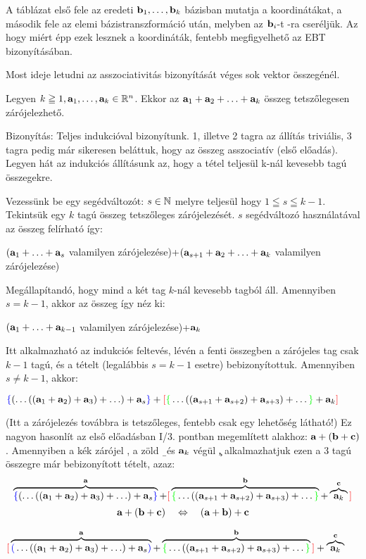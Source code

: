 \documentclass[a4paper,11.5pt]{article}
\begin{document}
	   A táblázat első fele az eredeti $\textbf{b}_1,\ldots,\textbf{b}_k$ bázisban mutatja a koordinátákat, a második fele az elemi bázistranszformáció után, melyben az $\textbf{b}_i$-t \a-ra cseréljük. Az hogy miért épp ezek lesznek a koordináták, fentebb megfigyelhető az EBT bizonyításában.
	
	Most ideje letudni az asszociativitás bizonyítását véges sok vektor összegénél.
	\begin{theorem}
		Legyen $k\geqq 1, \textbf{a}_1, \ldots, \textbf{a}_k \in \mathbb{R}^n$. Ekkor az $\textbf{a}_1+\textbf{a}_2+\ldots+\textbf{a}_k$ összeg tetszőlegesen zárójelezhető.
		
		\noindent Bizonyítás: Teljes indukcióval bizonyítunk. 1, illetve 2 tagra az állítás triviális, 3 tagra pedig már sikeresen beláttuk, hogy az összeg asszociatív (első előadás). Legyen hát az indukciós állításunk az, hogy a tétel teljesül k-nál kevesebb tagú összegekre.
		
		\noindent Vezessünk be egy segédváltozót: $s\in\mathbb{N}$ melyre teljesül hogy $1\leqq s \leqq k-1$. Tekintsük egy $k$ tagú összeg tetszőleges zárójelezését. $s$ segédváltozó használatával az összeg felírható így:
		\begin{center}
			$ (\textbf{a}_1+\ldots+\textbf{a}_s$ valamilyen zárójelezése)+$(\textbf{a}_{s+1}+\textbf{a}_2+\ldots+\textbf{a}_k $ valamilyen zárójelezése)
		\end{center}
		\noindent
		Megállapítandó, hogy mind a két tag $k$-nál kevesebb tagból áll. Amennyiben $s=k-1$, akkor az összeg így néz ki:
		
		\begin{center}
			$ (\textbf{a}_1+\ldots+\textbf{a}_{k-1}$ valamilyen zárójelezése)+$\textbf{a}_k $
		\end{center}
		
		\noindent Itt alkalmazható az indukciós feltevés, lévén a fenti összegben a zárójeles tag csak $k-1$ tagú, és a tételt (legalábbis $s=k-1$ esetre) bebizonyítottuk. Amennyiben $s\not=k-1$, akkor:
		\begin{center}
			$ \textcolor{blue}{\{}
			(\ldots((\textbf{a}_1+\textbf{a}_2)+\textbf{a}_3)+\ldots)+\textbf{a}_s\textcolor{blue}{\}}+ \textcolor{red}{[}\textcolor{green}{\{}\ldots((\textbf{a}_{s+1}+\textbf{a}_{s+2})+\textbf{a}_{s+3})+\ldots\textcolor{green}{\}}+\textbf{a}_{k}\textcolor{red}{]}$
		\end{center}
		
		\noindent (Itt a zárójelezés továbbra is tetszőleges, fentebb csak egy lehetőség látható!) Ez nagyon hasonlít az első előadásban I/3. pontban megemlített alakhoz: $\textbf{a}+(\textbf{b}+\textbf{c})$. Amennyiben a kék zárójel \a, a zöld \b\ és $\textbf{a}_k$ végül \c, alkalmazhatjuk ezen a 3 tagú összegre már bebizonyított tételt, azaz:
		$$ \overbrace{\textcolor{blue}{\{}
		(\ldots((\textbf{a}_1+\textbf{a}_2)+\textbf{a}_3)+\ldots)+\textbf{a}_s\textcolor{blue}{\}}}^{\textbf{a}}+ \textcolor{red}{[}\overbrace{\textcolor{green}{\{}\ldots((\textbf{a}_{s+1}+\textbf{a}_{s+2})+\textbf{a}_{s+3})+\ldots\textcolor{green}{\}}}^{\textbf{b}}+\overbrace{\textbf{a}_{k}}^{\textbf{c}}\textcolor{red}{]}$$
		\[ \textbf{a}+(\textbf{b}+\textbf{c})\quad \Leftrightarrow\quad (\textbf{a}+\textbf{b})+\textbf{c} \]
		\begin{center}
			$ \textcolor{red}{[}
			\overbrace{\textcolor{blue}{(}\ldots((\textbf{a}_1+\textbf{a}_2)+\textbf{a}_3)+\ldots)+\textbf{a}_s\textcolor{blue}{)}}^{\textbf{a}}+ \overbrace{\textcolor{green}{\{}\ldots((\textbf{a}_{s+1}+\textbf{a}_{s+2})+\textbf{a}_{s+3})+\ldots\textcolor{green}{\}}}^{\textbf{b}}\textcolor{red}{]}+\overbrace{\textbf{a}_{k}}^{\textbf{c}}$
		\end{center}
		

\end{theorem}
\end{document}
